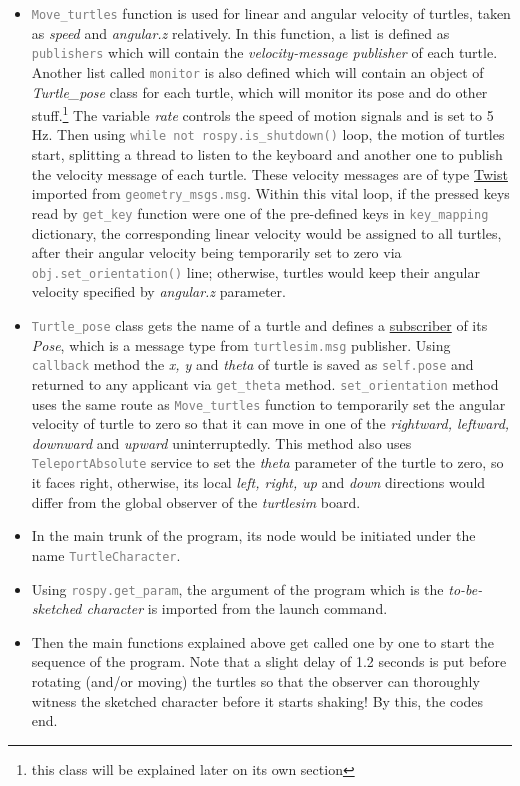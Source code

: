 \documentclass[conference]{IEEEtran}
\newcommand{\command}[1]{\textcolor{gray}{\footnotesize \texttt{#1}}}
\begin{document}
\begin{itemize}
    \item \command{Move\_turtles} function is used for linear and angular velocity of turtles, taken as \textit{speed} and \textit{angular.z} relatively. In this function, a list is defined as \command{publishers} which will contain the \textit{velocity-message publisher} of each turtle. Another list called \command{monitor} is also defined which will contain an object of \textit{Turtle\_pose} class for each turtle, which will monitor its pose and do other stuff.\footnote{this class will be explained later on its own section} The variable \textit{rate} controls the speed of motion signals and is set to 5 Hz. Then using \command{while not rospy.is\_shutdown()} loop, the motion of turtles start, splitting a thread to listen to the keyboard and another one to publish the velocity message of each turtle. These velocity messages are of type \underline{Twist} imported from \command{geometry\_msgs.msg}. Within this vital loop, if the pressed keys read by \command{get\_key} function were one of the pre-defined keys in \command{key\_mapping} dictionary, the corresponding linear velocity would be assigned to all turtles, after their angular velocity being temporarily set to zero via \command{obj.set\_orientation()} line; otherwise, turtles would keep their angular velocity specified by \textit{angular.z} parameter.
    \item \command{Turtle\_pose} class gets the name of a turtle and defines a \underline{subscriber} of its \textit{Pose}, which is a message type from \command{turtlesim.msg} publisher. Using \command{callback} method the \textit{x, y} and \textit{theta} of turtle is saved as \command{self.pose} and returned to any applicant via \command{get\_theta} method. \command{set\_orientation} method uses the same route as \command{Move\_turtles} function to temporarily set the angular velocity of turtle to zero so that it can move in one of the \textit{rightward, leftward, downward} and \textit{upward} uninterruptedly. This method also uses \command{TeleportAbsolute} service to set the \textit{theta} parameter of the turtle to zero, so it faces right, otherwise, its local \textit{left, right, up} and \textit{down} directions would differ from the global observer of the \textit{turtlesim} board.
    \item In the main trunk of the program, its node would be initiated under the name \command{TurtleCharacter}.
    \item Using \command{rospy.get\_param}, the argument of the program which is the \textit{to-be-sketched character} is imported from the launch command.
    \item  Then the main functions explained above get called one by one to start the sequence of the program. Note that a slight delay of 1.2 seconds is put before rotating (and/or moving) the turtles so that the observer can thoroughly witness the sketched character before it starts shaking! By this, the codes end.
\end{itemize}
\vspace{20px}
\end{document}
